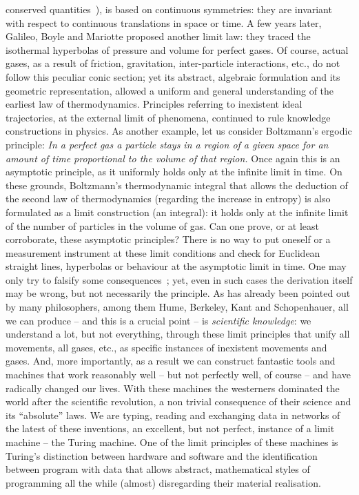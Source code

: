 \documentclass[12pt]{article}
\begin{document}
conserved quantities~\cite{noether1918invariante}), is based on continuous symmetries: they are invariant with respect
to continuous translations in space or time.
A few years later, Galileo, Boyle and Mariotte proposed another limit law: they traced the isothermal hyperbolas of
pressure and volume for perfect gases.
Of course, actual gases, as a result of friction, gravitation, inter-particle interactions, etc., do not follow this peculiar
conic section;
yet its abstract, algebraic formulation and its geometric representation, allowed a uniform and general understanding of
the earliest law of thermodynamics.
Principles referring to inexistent ideal trajectories, at the external limit of phenomena, continued to rule knowledge
constructions in physics.
As another example, let us consider Boltzmann's ergodic principle:
{\em In a perfect gas a particle stays in a region of a given space for an amount of time proportional to the volume of
that region. }
Once again this is an asymptotic principle, as it uniformly holds only at the infinite limit in time.
On these grounds, Boltzmann's thermodynamic integral that allows the deduction of the second law of thermodynamics
(regarding the increase in entropy) is also formulated as a limit construction (an integral):
it holds only at the infinite limit of the number of particles in the volume of gas.
Can one prove, or at least corroborate,
these asymptotic principles?
There is no way to put oneself or a measurement instrument at these limit conditions and check for Euclidean straight
lines, hyperbolas or behaviour at the asymptotic limit in time.
One may only try to falsify some consequences~\cite{popper-en};
yet, even in such cases the derivation itself may be wrong, but  not necessarily the principle.
As has already been pointed out by many philosophers, among them Hume, Berkeley, Kant and Schopenhauer,
all we can produce -- and this is a crucial point -- is {\em scientific knowledge}: we understand a lot, but not everything,
through these limit principles that unify all movements, all gases, etc., as specific instances of inexistent movements and
gases.
And, more importantly, as a result we can construct fantastic tools and machines  that work reasonably well -- but not perfectly well, of course -- and have radically changed our lives.
With these machines the westerners dominated the world after the scientific revolution, a non trivial consequence
of their science and its ``absolute'' laws.
We are typing, reading and exchanging data in networks of the latest of these inventions, an excellent, but not perfect,
instance of a limit machine -- the Turing machine.
One of the limit principles of these machines is  Turing's
distinction between hardware and software and the identification between program with data that allows abstract,
mathematical styles of programming all the while (almost) disregarding their material realisation.
\end{document}
